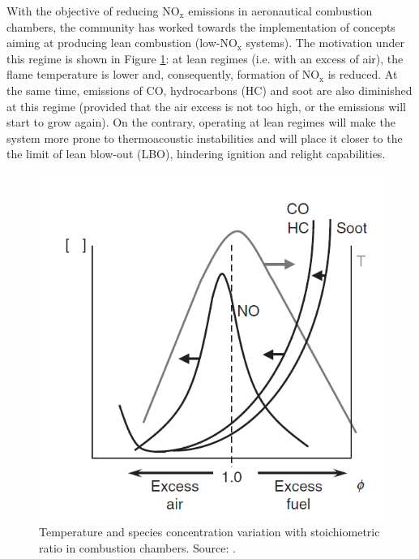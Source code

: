 
With the objective of reducing NO$_\mathrm{x}$ emissions in aeronautical combustion chambers, the community has worked towards the implementation of concepts aiming at producing lean combustion (low-NO$_\mathrm{x}$ systems). The motivation under this regime is shown in Figure \ref{fig:NOx_and_others_vs_equivalence_ratio}: at lean regimes (i.e. with an excess of air), the flame temperature is lower and, consequently, formation of NO$_\mathrm{x}$ is reduced. At the same time, emissions of CO, hydrocarbons (HC) and soot are also diminished at this regime (provided that the air excess is not too high, or the emissions will start to grow again). On the contrary, operating at lean regimes will make the system more prone to thermoacoustic instabilities and will place it closer to the the limit of lean blow-out (LBO), hindering ignition and relight capabilities. 

\begin{figure}[h!]
	\centering
	\includegraphics[scale=0.8]{./part0_intro/NOx_and_others_vs_equivalence_ratio}
	\caption{Temperature and species concentration variation with stoichiometric ratio in combustion chambers. Source: .}
	\label{fig:NOx_and_others_vs_equivalence_ratio}
\end{figure}

